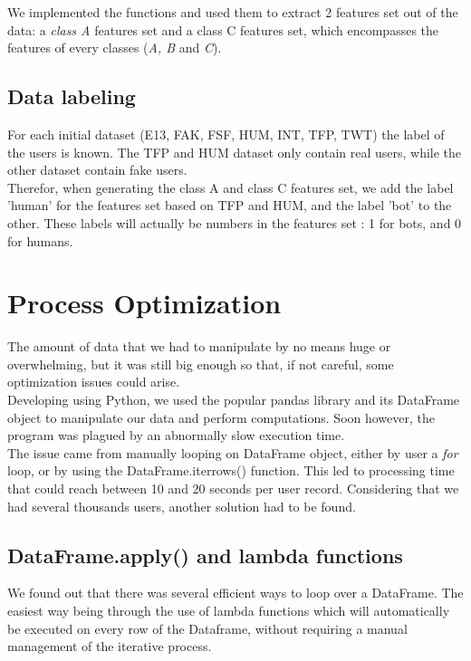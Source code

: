 \documentclass[a4paper,11pt]{article}
\begin{document}
We implemented the functions and used them to extract 2 features set out of the data: a \textit{class A} features set and a class C features set, which encompasses the features of every classes (\textit{A, B} and \textit{C}).

\subsection{Data labeling}
For each initial dataset (E13, FAK, FSF, HUM, INT, TFP, TWT) the label of the users is known. The TFP and HUM dataset only contain real users, while the other dataset contain fake users.\\

Therefor, when generating the class A and class C features set, we add the label 'human' for the features set based on TFP and HUM, and the label 'bot' to the other. These labels will actually be numbers in the features set : 1 for bots, and 0 for humans.

\section{Process Optimization}
The amount of data that we had to manipulate by no means huge or overwhelming, but it was still big enough so that, if not careful, some optimization issues could arise.\\

Developing using Python, we used the popular pandas library and its DataFrame object to manipulate our data and perform computations. Soon however, the program was plagued by an abnormally slow execution time.\\

The issue came from manually looping on DataFrame object, either by user a \textit{for} loop, or by using the DataFrame.iterrows() function. This led to processing time that could reach between 10 and 20 seconds per user record. Considering that we had several thousands users, another solution had to be found.

\subsection{DataFrame.apply() and lambda functions}
We found out that there was several efficient ways to loop over a DataFrame. The easiest way being through the use of lambda functions which will automatically be executed on every row of the Dataframe, without requiring a manual management of the iterative process.\\
\end{document}
